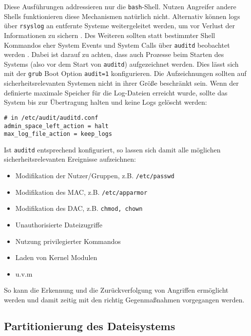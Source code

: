 Diese Ausführungen addressieren nur die \texttt{bash}-Shell. Nutzen Angreifer andere Shells funktionieren diese Mechanismen natürlich nicht. 
Alternativ können logs über \texttt{rsyslog} an entfernte Systeme weitergeleitet werden, um vor Verlust der Informationen zu sichern \cite{cis}. 
Des Weiteren sollten statt bestimmter Shell Kommandos eher System Events und System Calls über \texttt{auditd} beobachtet werden \cite{cis}. Dabei ist darauf zu achten, dass auch Prozesse beim Starten des Systems (also vor dem Start von \texttt{auditd}) aufgezeichnet werden. Dies lässt sich mit der \texttt{grub} Boot Option \texttt{audit=1} konfigurieren. Die Aufzeichnungen sollten auf sicherheitsrelevanten Systemen nicht in ihrer Größe beschränkt sein. Wenn der definierte
maximale Speicher für die Log-Dateien erreicht wurde, sollte das System bis zur Übertragung halten und keine Logs gelöscht werden:

\begin{lstlisting}
# in /etc/audit/auditd.conf
admin_space_left_action = halt
max_log_file_action = keep_logs
\end{lstlisting}

Ist \texttt{auditd} entsprechend konfiguriert, so lassen sich damit alle möglichen sicherheitsrelevanten Ereignisse aufzeichnen:

\begin{itemize}
    \item Modifikation der Nutzer/Gruppen, z.B. \texttt{/etc/passwd}
    \item Modifikation des MAC, z.B. \texttt{/etc/apparmor}
    \item Modifikation des DAC, z.B. \texttt{chmod, chown}
    \item Unauthorisierte Dateizugriffe
    \item Nutzung privilegierter Kommandos
    \item Laden von Kernel Modulen
    \item u.v.m
\end{itemize}

So kann die Erkennung und die Zurückverfolgung von Angriffen ermöglicht werden und damit zeitig mit den richtig Gegenmaßnahmen vorgegangen werden.


\subsection{Partitionierung des Dateisystems}

